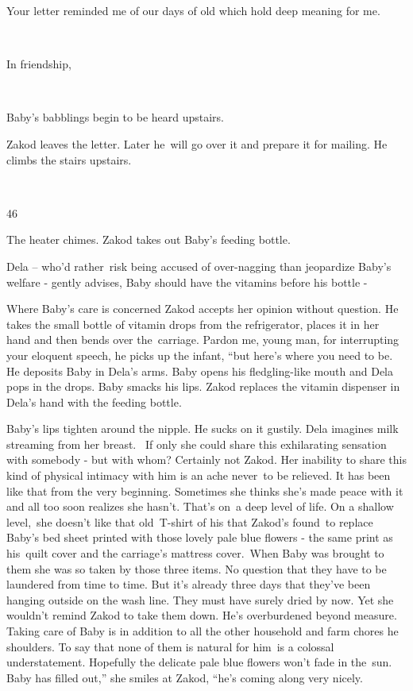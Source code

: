 \documentclass[letterpaper]{article}
\begin{document}
Your letter reminded me of our days of old which hold deep meaning for me. 

~

In friendship,

~

Baby's babblings begin to be heard upstairs.~~~~~ 

Zakod leaves the letter. Later he~will go over it and prepare it for mailing. He climbs the stairs upstairs.

~

46\ 

The heater chimes. Zakod takes out Baby's feeding bottle. 

Dela -- who'd rather~risk being accused of over-nagging than jeopardize Baby's welfare - gently advises,
{\textquotedbl}Baby should have the vitamins before his bottle -{\textquotedbl} 

Where Baby's care is concerned Zakod accepts her opinion without question. He takes the small bottle of vitamin drops
from the refrigerator, places it in her hand and then bends over the\ carriage. {\textquotedbl}Pardon me, young man,
for interrupting your eloquent speech,{\textquotedbl} he picks up the infant, ``but here's where you need to
be.{\textquotedbl} He deposits Baby in Dela's arms. Baby opens his fledgling-like mouth and Dela pops in the drops.
Baby smacks his lips. Zakod replaces the vitamin dispenser in Dela's hand with the feeding bottle. 

Baby's lips tighten around the nipple. He sucks on it gustily. Dela imagines milk streaming from her breast. \ If only
she could share this exhilarating sensation with somebody - but with whom? Certainly not Zakod. Her inability to share
this kind of physical intimacy with him is an ache never\ to be relieved. It has been like that from the very
beginning. Sometimes she thinks she's made peace with it and all too soon realizes she hasn't. That's on\ a deep level
of life. On a shallow level,\ she doesn't like that old\ T{}-shirt of his that Zakod's found\ to replace Baby's bed
sheet printed with those lovely pale blue flowers - the same print as his\ quilt cover and the carriage's mattress
cover.\ When Baby was brought to them she was so taken by those three items. No question that they have to be laundered
from time to time. But it's already three days that they've been hanging outside on the wash line. They must have
surely dried by now. Yet she wouldn{}'t remind Zakod to take them down. He's overburdened beyond measure. Taking care
of Baby is in addition to all the other household and farm chores he shoulders. To say that none of them is natural for
him~is a colossal understatement. Hopefully the delicate pale blue flowers won't fade in the~sun. {\textquotedbl}Baby
has filled out,'' she smiles at Zakod, ``he's coming along very nicely.{\textquotedbl} 
\end{document}
